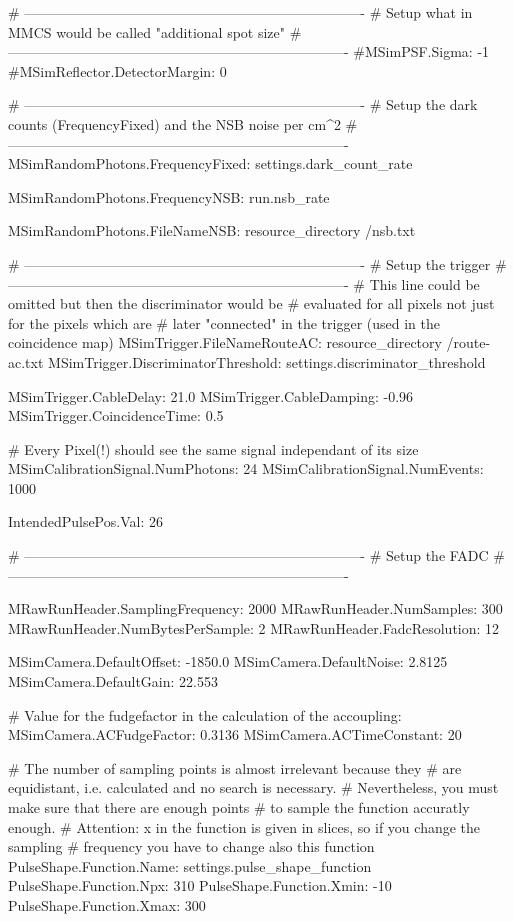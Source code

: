 {{{# -------------------------------------------------------------------------
# Setup what in MMCS would be called "additional spot size"
# -------------------------------------------------------------------------
#MSimPSF.Sigma: -1
#MSimReflector.DetectorMargin: 0

# -------------------------------------------------------------------------
# Setup the dark counts (FrequencyFixed) and the NSB noise per cm^2
# -------------------------------------------------------------------------
MSimRandomPhotons.FrequencyFixed: {{ settings.dark_count_rate }}
{%
MSimRandomPhotons.FrequencyNSB: {{ run.nsb_rate }}
{%
MSimRandomPhotons.FileNameNSB:  {{ resource_directory }}/nsb.txt
{%


# -------------------------------------------------------------------------
# Setup the trigger
# -------------------------------------------------------------------------
# This line could be omitted but then the discriminator would be
# evaluated for all pixels not just for the pixels which are
# later "connected" in the trigger (used in the coincidence map)
MSimTrigger.FileNameRouteAC: {{ resource_directory }}/route-ac.txt
MSimTrigger.DiscriminatorThreshold: {{ settings.discriminator_threshold }}

MSimTrigger.CableDelay: 21.0
MSimTrigger.CableDamping: -0.96
MSimTrigger.CoincidenceTime: 0.5

# Every Pixel(!) should see the same signal independant of its size
MSimCalibrationSignal.NumPhotons: 24
MSimCalibrationSignal.NumEvents:  1000

IntendedPulsePos.Val: 26

# -------------------------------------------------------------------------
# Setup the FADC
# -------------------------------------------------------------------------

MRawRunHeader.SamplingFrequency: 2000
MRawRunHeader.NumSamples:        300
MRawRunHeader.NumBytesPerSample: 2
MRawRunHeader.FadcResolution:    12

MSimCamera.DefaultOffset:       -1850.0
MSimCamera.DefaultNoise:        2.8125
MSimCamera.DefaultGain:         22.553


# Value for the fudgefactor in the calculation of the accoupling:
MSimCamera.ACFudgeFactor: 0.3136
MSimCamera.ACTimeConstant: 20


# The number of sampling points is almost irrelevant because they
# are equidistant, i.e. calculated and no search is necessary.
# Nevertheless, you must make sure that there are enough points
# to sample the function accuratly enough.
# Attention: x in the function is given in slices, so if you change the sampling
# frequency you have to change also this function
PulseShape.Function.Name:  {{ settings.pulse_shape_function }}
PulseShape.Function.Npx:   310
PulseShape.Function.Xmin:  -10
PulseShape.Function.Xmax:  300



}}}}}}
